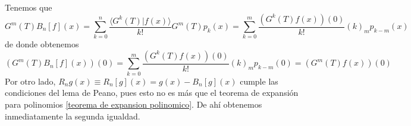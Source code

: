 \begin{demo}
    Tenemos que
    \begin{equation*}
        G^m(T)B_n[f](x) = \sum_{k=0}^n \frac{\langle G^k(T) | f(x) \rangle}{k!} G^m(T)p_k(x) = \sum_{k=0}^m \frac{(G^k(T)f(x))(0)}{k!} (k)_m p_{k-m}(x)
    \end{equation*}
    de donde obtenemos
    \begin{equation*}
        (G^m(T)B_n[f](x))(0) = \sum_{k=0}^m \frac{(G^k(T)f(x))(0)}{k!} (k)_m p_{k-m}(0) = (G^m(T)f(x))(0)
    \end{equation*}
    Por otro lado, $R_n g(x) \equiv R_n[g](x) = g(x) - B_n[g](x)$ cumple las condiciones del lema de Peano, pues esto no es más que el teorema de expansión para polinomios \ref{teorema de expansion polinomico}. De ahí obtenemos inmediatamente la segunda igualdad. 
\end{demo}
\bigskip
